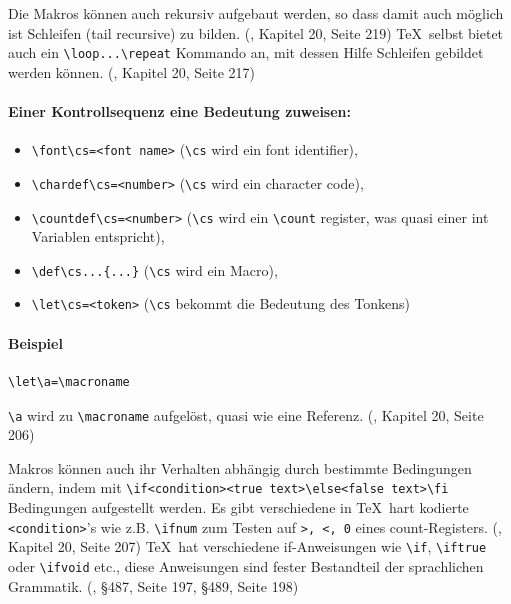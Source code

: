 Die Makros können auch rekursiv aufgebaut werden, so dass damit auch möglich ist
Schleifen (tail recursive) zu bilden.
(\cite{tex-a}, Kapitel 20, Seite 219)
\TeX~selbst bietet auch ein \lstinline|\loop...\repeat| Kommando an,
mit dessen Hilfe Schleifen gebildet werden können.
(\cite{tex-a}, Kapitel 20, Seite 217)


\paragraph{Einer Kontrollsequenz eine Bedeutung zuweisen:}

\begin{itemize}
  \item \lstinline|\font\cs=<font name>|
        (\lstinline|\cs| wird ein font identifier),
  \item \lstinline|\chardef\cs=<number>|
        (\lstinline|\cs| wird ein character code),
  \item \lstinline|\countdef\cs=<number>|
        (\lstinline|\cs| wird ein \lstinline|\count| register,
        was quasi einer int Variablen entspricht),
  \item \lstinline|\def\cs...{...}|
        (\lstinline|\cs| wird ein Macro),
  \item \lstinline|\let\cs=<token>|
        (\lstinline|\cs| bekommt die Bedeutung des Tonkens)
\end{itemize}

\paragraph{Beispiel}

\begin{verbatim}
\let\a=\macroname
\end{verbatim}

\lstinline|\a| wird zu \lstinline|\macroname| aufgelöst, quasi wie eine Referenz.
(\cite{tex-a}, Kapitel 20, Seite 206)


Makros können auch ihr Verhalten abhängig durch bestimmte Bedingungen
ändern, indem mit \lstinline|\if<condition><true text>\else<false text>\fi|
Bedingungen
aufgestellt werden. Es gibt verschiedene in \TeX~hart kodierte
\lstinline|<condition>|'s
wie z.B. \lstinline|\ifnum| zum Testen auf \lstinline|>, <, 0| eines count-Registers.
(\cite{tex-a}, Kapitel 20, Seite 207)
\TeX~hat verschiedene if-Anweisungen wie \lstinline|\if|, \lstinline|\iftrue| oder \lstinline|\ifvoid| etc.,
diese Anweisungen sind fester Bestandteil der sprachlichen Grammatik.
(\cite{tex-a}, §487, Seite 197, §489, Seite 198)

